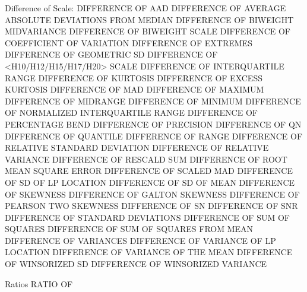 Difference of Scale:
   DIFFERENCE OF AAD
   DIFFERENCE OF AVERAGE ABSOLUTE DEVIATIONS FROM MEDIAN
   DIFFERENCE OF BIWEIGHT MIDVARIANCE
   DIFFERENCE OF BIWEIGHT SCALE
   DIFFERENCE OF COEFFICIENT OF VARIATION
   DIFFERENCE OF EXTREMES
   DIFFERENCE OF GEOMETRIC SD
   DIFFERENCE OF <H10/H12/H15/H17/H20> SCALE
   DIFFERENCE OF INTERQUARTILE RANGE
   DIFFERENCE OF KURTOSIS
   DIFFERENCE OF EXCESS KURTOSIS
   DIFFERENCE OF MAD
   DIFFERENCE OF MAXIMUM
   DIFFERENCE OF MIDRANGE
   DIFFERENCE OF MINIMUM
   DIFFERENCE OF NORMALIZED INTERQUARTILE RANGE
   DIFFERENCE OF PERCENTAGE BEND
   DIFFERENCE OF PRECISION
   DIFFERENCE OF QN
   DIFFERENCE OF QUANTILE
   DIFFERENCE OF RANGE
   DIFFERENCE OF RELATIVE STANDARD DEVIATION
   DIFFERENCE OF RELATIVE VARIANCE
   DIFFERENCE OF RESCALD SUM
   DIFFERENCE OF ROOT MEAN SQUARE ERROR
   DIFFERENCE OF SCALED MAD
   DIFFERENCE OF SD OF LP LOCATION
   DIFFERENCE OF SD OF MEAN
   DIFFERENCE OF SKEWNESS
   DIFFERENCE OF GALTON SKEWNESS
   DIFFERENCE OF PEARSON TWO SKEWNESS
   DIFFERENCE OF SN
   DIFFERENCE OF SNR
   DIFFERENCE OF STANDARD DEVIATIONS
   DIFFERENCE OF SUM OF SQUARES
   DIFFERENCE OF SUM OF SQUARES FROM MEAN
   DIFFERENCE OF VARIANCES
   DIFFERENCE OF VARIANCE OF LP LOCATION
   DIFFERENCE OF VARIANCE OF THE MEAN
   DIFFERENCE OF WINSORIZED SD
   DIFFERENCE OF WINSORIZED VARIANCE

Ratios
   RATIO OF

